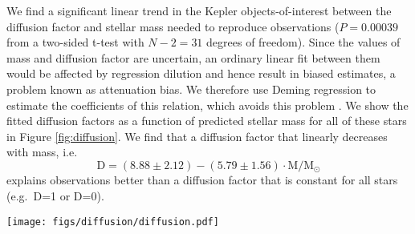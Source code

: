 \documentclass[manuscript]{aastex}
\begin{document}
We find a significant linear trend in the Kepler objects-of-interest between the diffusion factor and stellar mass needed to reproduce observations ($P = 0.00039$ from a two-sided t-test with $N-2=31$ degrees of freedom). Since the values of mass and diffusion factor are uncertain, an ordinary linear fit between them would be affected by regression dilution and hence result in biased estimates, a problem known as attenuation bias. We therefore use Deming regression to estimate the coefficients of this relation, which avoids this problem \citep{deming1943statistical}. We show the fitted diffusion factors as a function of predicted stellar mass for all of these stars in Figure \ref{fig:diffusion}. We find that a diffusion factor that linearly decreases with mass, i.e.~
\begin{equation}
    \text{D} = ( 8.88 \pm 2.12 ) - ( 5.79 \pm 1.56 ) \cdot \text{M}/\text{M}_\odot
\end{equation}
explains observations better than a diffusion factor that is constant for all stars (e.g.~D=1 or D=0). 

\begin{figure*}
    \centering
    \texttt{[image: figs/diffusion/diffusion.pdf]}
    \caption{Diffusion factor as a function of stellar mass for 33 Kepler objects-of-interest, with D being shown in log space. A significant linear trend can be seen to exist between D and M. \label{fig:diffusion} } 
\end{figure*}

\end{document}
